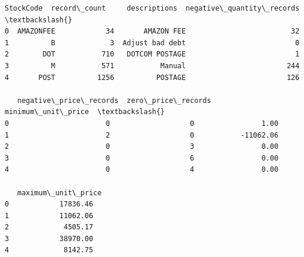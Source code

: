 \documentclass[11pt]{article}
\begin{document}
    
    \begin{Verbatim}[commandchars=\\\{\}]
   StockCode  record\_count     descriptions  negative\_quantity\_records  \textbackslash{}
0  AMAZONFEE            34       AMAZON FEE                         32   
1          B             3  Adjust bad debt                          0   
2        DOT           710   DOTCOM POSTAGE                          1   
3          M           571           Manual                        244   
4       POST          1256          POSTAGE                        126   

   negative\_price\_records  zero\_price\_records  minimum\_unit\_price  \textbackslash{}
0                       0                   0                1.00   
1                       2                   0           -11062.06   
2                       0                   3                0.00   
3                       0                   6                0.00   
4                       0                   4                0.00   

   maximum\_unit\_price  
0            17836.46  
1            11062.06  
2             4505.17  
3            38970.00  
4             8142.75  
    \end{Verbatim}
\end{document}
